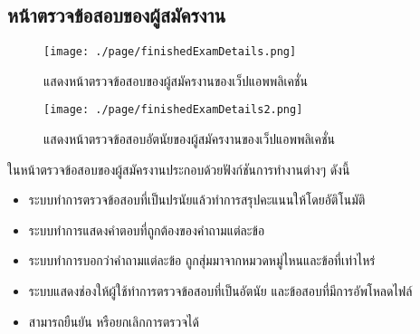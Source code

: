 \subsection{หน้าตรวจข้อสอบของผู้สมัครงาน}
\begin{figure}[H]
  \centering
  \texttt{[image: ./page/finishedExamDetails.png]}
  \caption{แสดงหน้าตรวจข้อสอบของผู้สมัครงานของเว็ปแอพพลิเคชั่น}
  \label{Fig:finishedExamDetails}
\end{figure}
\begin{figure}[H]
    \centering
    \texttt{[image: ./page/finishedExamDetails2.png]}
    \caption{แสดงหน้าตรวจข้อสอบอัตนัยของผู้สมัครงานของเว็ปแอพพลิเคชั่น}
    \label{Fig:FinishedExamDetailATN}
  \end{figure}
ในหน้าตรวจข้อสอบของผู้สมัครงานประกอบด้วยฟังก์ชันการทำงานต่างๆ ดังนี้
\begin{itemize}
    \item ระบบทำการตรวจข้อสอบที่เป็นปรนัยแล้วทำการสรุปคะแนนให้โดยอัติโนมัติ
    \item ระบบทำการแสดงคำตอบที่ถูกต้องของคำถามแต่ละข้อ
    \item ระบบทำการบอกว่าคำถามแต่ละข้อ ถูกสุ่มมาจากหมวดหมู่ไหนและข้อที่เท่าไหร่
    \item ระบบแสดงช่องให้ผู้ใช้ทำการตรวจข้อสอบที่เป็นอัตนัย และข้อสอบที่มีการอัพโหลดไฟล์
    \item สามารถยืนยัน หรือยกเลิกการตรวจได้
\end{itemize}